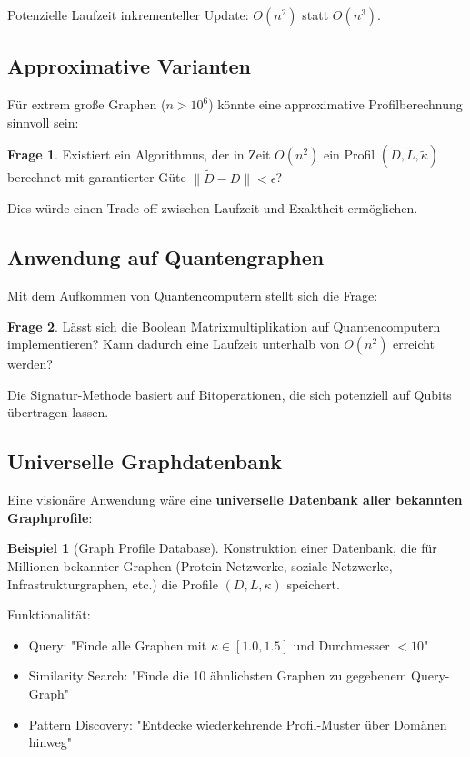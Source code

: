 ﻿\documentclass[a4paper,12pt]{article}
\theoremstyle{definition}
\newtheorem{beispiel}{Beispiel}
\newtheorem{frage}{Frage}
\begin{document}
	Potenzielle Laufzeit inkrementeller Update: $O(n^2)$ statt $O(n^3)$.
	
	\subsection{Approximative Varianten}
	
	Für extrem große Graphen ($n > 10^6$) könnte eine approximative Profilberechnung sinnvoll sein:
	
	\begin{frage}
		Existiert ein Algorithmus, der in Zeit $O(n^2)$ ein Profil $(\tilde{D}, \tilde{L}, \tilde{\kappa})$ berechnet mit garantierter Güte $\|\tilde{D} - D\| < \epsilon$?
	\end{frage}
	
	Dies würde einen Trade-off zwischen Laufzeit und Exaktheit ermöglichen.
	
	\subsection{Anwendung auf Quantengraphen}
	
	Mit dem Aufkommen von Quantencomputern stellt sich die Frage:
	
	\begin{frage}
		Lässt sich die Boolean Matrixmultiplikation auf Quantencomputern implementieren? Kann dadurch eine Laufzeit unterhalb von $O(n^2)$ erreicht werden?
	\end{frage}
	
	Die Signatur-Methode basiert auf Bitoperationen, die sich potenziell auf Qubits übertragen lassen.
	
	\subsection{Universelle Graphdatenbank}
	
	Eine visionäre Anwendung wäre eine \textbf{universelle Datenbank aller bekannten Graphprofile}:
	
	\begin{beispiel}[Graph Profile Database]
		Konstruktion einer Datenbank, die für Millionen bekannter Graphen (Protein-Netzwerke, soziale Netzwerke, Infrastrukturgraphen, etc.) die Profile $(D, L, \kappa)$ speichert.
		
		Funktionalität:
		\begin{itemize}
			\item[-] Query: "Finde alle Graphen mit $\kappa \in [1.0, 1.5]$ und Durchmesser $< 10$"
			\item[-] Similarity Search: "Finde die 10 ähnlichsten Graphen zu gegebenem Query-Graph"
			\item[-] Pattern Discovery: "Entdecke wiederkehrende Profil-Muster über Domänen hinweg"
		\end{itemize}
	\end{beispiel}
	
\end{document}

